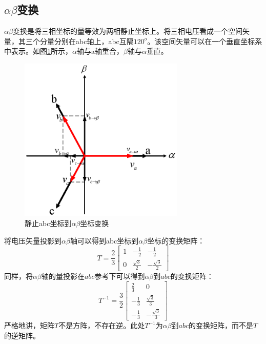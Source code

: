 \subsection{$\alpha\beta$变换}
$\alpha\beta$变换是将三相坐标的量等效为两相静止坐标上。将三相电压看成一个空间矢量，其三个分量分别在abc轴上，abc互隔$120^{o}$。该空间矢量可以在一个垂直坐标系中表示。如图\ref{fig:alphabeta}所示，$\alpha$轴与a轴重合，$\beta$轴与$\alpha$垂直。
\begin{figure}[H]
	\centering
	\includegraphics[width=0.7\textwidth]{figs/alphabeta.eps}
	\caption{静止abc坐标到$\alpha\beta$坐标变换}
	\label{fig:alphabeta}
\end{figure}
将电压矢量投影到$\alpha\beta$轴可以得到abc坐标到$\alpha\beta$坐标的变换矩阵：
\begin{equation}\label{eq:abc2ab}
T=\frac{2}{3}\begin{bmatrix}1&-\frac{1}{2}&-\frac{1}{2}\\0&\frac{\sqrt{3}}{2}&-\frac{\sqrt{3}}{2}\end{bmatrix}
\end{equation}
同样，将$\alpha\beta$轴的量投影在$abc$参考下可以得到$\alpha\beta$到$abc$的变换矩阵：
\begin{equation}
T^{-1} =\frac32\begin{bmatrix} \frac23 & 0 \\
-\frac{1}{3} & \frac{\sqrt{3}}{3} \\
-\frac{1}{3} & -\frac{\sqrt{3}}{3} \end{bmatrix} 
\end{equation}
严格地讲，矩阵$T$不是方阵，不存在逆。此处$T^{-1}$为$\alpha\beta$到$abc$的变换矩阵，而不是$T$的逆矩阵。
